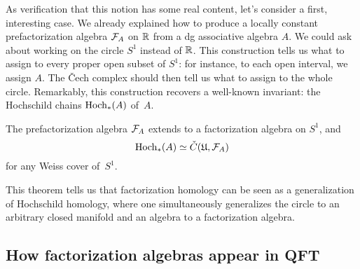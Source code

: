 \documentclass[11pt]{amsart}
\def\owen#1{{\textcolor{violet!65!black}{OG: {#1}}}}
\begin{document}
As verification that this notion has some real content, let's consider a first, interesting case.
We already explained how to produce a locally constant prefactorization algebra $\mathcal F_A$ on $\mathbb R$ from a dg associative algebra $A$.
We could ask about working on the circle $S^1$ instead of $\mathbb R$.
This construction tells us what to assign to every proper open subset of $S^1$: for instance, to each open interval, we assign $A$.
The \v{C}ech complex should then tell us what to assign to the whole circle.
Remarkably, this construction recovers a well-known invariant: the Hochschild chains ${\rm Hoch}_*(A)$ of~$A$.

\begin{thm}[\owen{citations}]
The prefactorization algebra $\mathcal F_A$ extends to a factorization algebra on $S^1$, and
\[
{\rm Hoch}_*(A) \simeq \check{C}(\mathfrak{U},\mathcal F_A)
\]
for any Weiss cover of~$S^1$.
\end{thm}

This theorem tells us that factorization homology can be seen as a generalization of Hochschild homology,
where one simultaneously generalizes the circle to an arbitrary closed manifold and an algebra to a factorization algebra.

%

\subsection{How factorization algebras appear in QFT}
\end{document}
